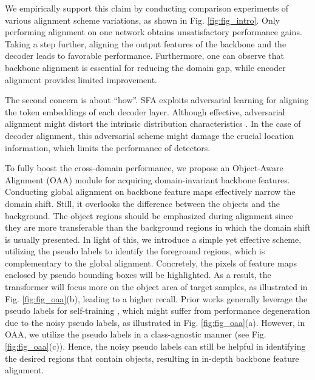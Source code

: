 \documentclass[sigconf]{acmart}
\begin{document}
We empirically support this claim by conducting comparison experiments of various alignment scheme variations, as shown in Fig. \ref{fig:fig_intro}. Only performing alignment on one network obtains unsatisfactory performance gains. Taking a step further, aligning the output features of the backbone and the decoder leads to favorable performance. Furthermore, one can observe that backbone alignment is essential for reducing the domain gap, while encoder alignment provides limited improvement.

The second concern is about ``how''. SFA \cite{wang2021exploring} exploits adversarial learning for aligning the token embeddings of each decoder layer. Although effective, adversarial alignment might distort the intrinsic distribution characteristics \cite{bsp}. In the case of decoder alignment, this adversarial scheme might damage the crucial location information, which limits the performance of detectors. 




\label{section:introduction}



To fully boost the cross-domain performance, we propose an Object-Aware Alignment (OAA) module for acquiring domain-invariant backbone features. Conducting global alignment on backbone feature maps effectively narrow the domain shift. Still, it overlooks the difference between the objects and the background. The object regions should be emphasized during alignment since they are more transferable than the background regions in which the domain shift is usually presented. In light of this, we introduce a simple yet effective scheme, utilizing the pseudo labels to identify the foreground regions, which is complementary to the global alignment. Concretely, the pixels of feature maps enclosed by pseudo bounding boxes will be highlighted. As a result, the transformer will focus more on the object area of target samples, as illustrated in Fig. \ref{fig:fig_oaa}(b), leading to a higher recall. Prior works generally leverage the pseudo labels for self-training \cite{kim2019self,jiang2021decoupled}, which might suffer from performance degeneration due to the noisy pseudo labels, as illustrated in Fig. \ref{fig:fig_oaa}(a). However, in OAA, we utilize the pseudo labels in a class-agnostic manner (see Fig. \ref{fig:fig_oaa}(c)). Hence, the noisy pseudo labels can still be helpful in identifying the desired regions that contain objects, resulting in in-depth backbone feature alignment.
\end{document}
